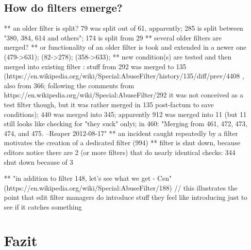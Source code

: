 \subsection{How do filters emerge?}
  ** an older filter is split? 79 was split out of 61, apparently; 285 is split between "380, 384, 614 and others"; 174 is split from 29
  ** several older filters are merged?
  ** or functionality of an older filter is took and extended in a newer one (479->631); (82->278); (358->633);
  ** new condition(s) are tested and then merged into existing filter : stuff from 292 was merged to 135 (https://en.wikipedia.org/wiki/Special:AbuseFilter/history/135/diff/prev/4408 , also from 366; following the comments from https://en.wikipedia.org/wiki/Special:AbuseFilter/292 it was not conceived as a test filter though, but it was rather merged in 135 post-factum to save conditions); 440 was merged into 345; apparently 912 was merged into 11 (but 11 still looks like checking for "they suck" only^^); in 460: "Merging from 461, 472, 473, 474, and 475. --Reaper 2012-08-17"
  ** an incident caught repeatedly by a filter motivates the creation of a dedicated filter (994)
  ** filter is shut down, because editors notice there are 2 (or more filters) that do nearly identical checks: 344 shut down because of 3

  ** "in addition to filter 148, let's see what we get - Cen" (https://en.wikipedia.org/wiki/Special:AbuseFilter/188) // this illustrates the point that edit filter managers do introduce stuff they feel like introducing just to see if it catches something


\section{Fazit}

